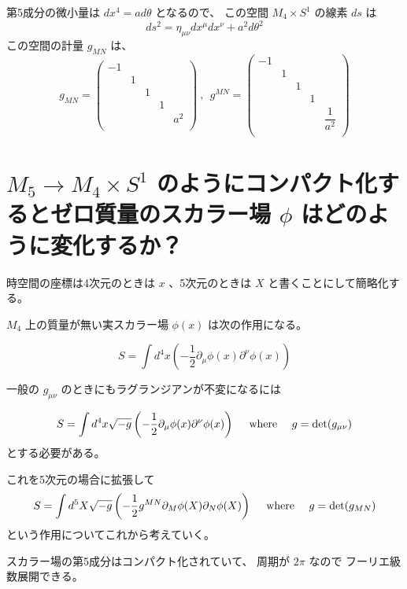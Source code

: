 \documentclass{article}
\begin{document}
第5成分の微小量は
$dx^{4} = a d \theta$
となるので、
この空間
$M_{4} \times S^{1}$
の線素
$ds$
は
$$
	ds^{2}
	=
	\eta_{\mu \nu}
	dx^{\mu} dx^{\nu}
	+
	a^{2} d \theta^{2}
$$
この空間の計量
$g_{MN}$
は、
$$
	g_{MN}
	=
	\begin{pmatrix}
		-1 &   &   &   &       \\
		   & 1 &   &   &       \\
		   &   & 1 &   &       \\
		   &   &   & 1 &       \\
		   &   &   &   & a^{2} \\
	\end{pmatrix}
	\ , \ \
	g^{MN}
	=
	\begin{pmatrix}
		-1 &   &   &   &                  \\
		   & 1 &   &   &                  \\
		   &   & 1 &   &                  \\
		   &   &   & 1 &                  \\
		   &   &   &   & \dfrac{1}{a^{2}} \\
	\end{pmatrix}
$$

\section{
  $M_{5} \to M_{4} \times S^{1}$
  のようにコンパクト化するとゼロ質量のスカラー場
  $\phi$
  はどのように変化するか？
 }

時空間の座標は4次元のときは
$x$
、5次元のときは
$X$
と書くことにして簡略化する。

$M_{4}$
上の質量が無い実スカラー場
$\phi(x)$
は次の作用になる。

$$
	S
	=
	\int d^{4} x
	\left(
	- \dfrac{1}{2}
	\partial_{\mu} \phi(x)
	\partial^{\nu} \phi(x)
	\right)
$$

一般の
$g_{\mu \nu}$
のときにもラグランジアンが不変になるには

$$
	S
	=
	\int d^{4} x
	\sqrt{ - g }
	\left(
	- \dfrac{1}{2}
	\partial_{\mu} \phi(x)
	\partial^{\nu} \phi(x)
	\right)
	\ \ \ \
	{ \rm where }
	\ \ \ \
	g = \det(g_{\mu \nu})
$$
とする必要がある。

これを5次元の場合に拡張して
$$
	S
	=
	\int d^{5} X
	\sqrt{ - g }
	\left(
	- \dfrac{1}{2}
	g^{MN}
	\partial_{M} \phi(X)
	\partial_{N} \phi(X)
	\right)
	\ \ \ \
	{ \rm where }
	\ \ \ \
	g = \det(g_{MN})
$$
という作用についてこれから考えていく。

スカラー場の第5成分はコンパクト化されていて、
周期が
$2 \pi$
なので
フーリエ級数展開できる。
\end{document}
